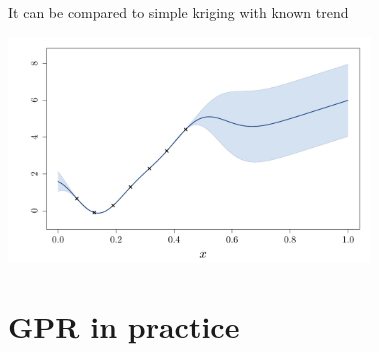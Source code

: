 \documentclass{beamer}
\begin{document}
\begin{frame}{}
It can be compared to simple kriging with known trend
\begin{center}
	\includegraphics[height=6cm]{figures/R/trend_kstrend}
\end{center}
\end{frame}

\section{GPR in practice}
\subsection{}
\end{document}
